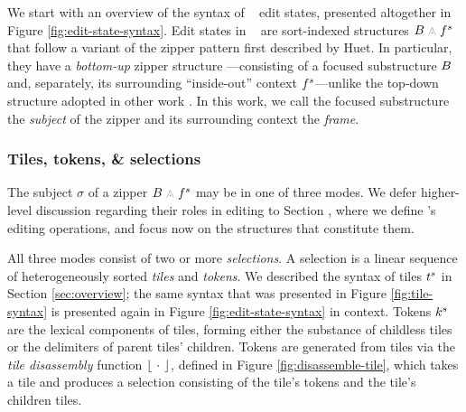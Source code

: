 
We start with an overview of the syntax of \ty~ edit states,
presented altogether in Figure \ref{fig:edit-state-syntax}.
Edit states in \ty~ are sort-indexed structures
$\zipper{\subject}{\tfrelem^s}$ that follow a variant
of the zipper pattern first described by Huet.
In particular, they have a \emph{bottom-up}
zipper structure ---consisting of a focused substructure
$B$ and, separately,
its surrounding ``inside-out'' context $f^s$---unlike
the top-down structure adopted in other work .
In this work, we call the focused substructure the \emph{subject} of
the zipper and its surrounding context the \emph{frame}.

\subsubsection{Tiles, tokens, \& selections}
The subject $\sigma$ of a zipper $\zipper{\subject}{\tfrelem^s}$
may be in one of three modes.
We defer higher-level discussion regarding their roles in
editing to Section , where we define \ty's editing
operations, and focus now on the structures that constitute them.




All three modes consist of two or more \emph{selections}.
A selection is a linear sequence of heterogeneously
sorted \emph{tiles} and \emph{tokens}.
We described the syntax of tiles $t^s$
in Section \ref{sec:overview};
the same syntax that was presented in Figure \ref{fig:tile-syntax}
is presented again in Figure \ref{fig:edit-state-syntax} in context.
Tokens $k^s$ are the lexical components of tiles, forming either
the substance of childless tiles or the delimiters of parent
tiles' children.
Tokens are generated from tiles via the \emph{tile disassembly} function
$\left\lfloor~\cdot~\right\rfloor$, defined in Figure \ref{fig:disassemble-tile},
which takes a tile and produces
a selection consisting of the tile's tokens
and the tile's children tiles.

